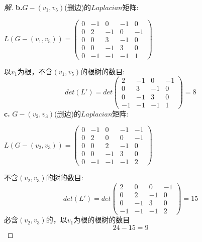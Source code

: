 \documentclass[UTF8, onecolumn, a4paper]{article}
\begin{document}
\begin{description}
\begin{proof}[解]
\textbf{b.}$G-(v_1,v_5)$(删边)的$Laplacian$矩阵:
\begin{center}
	$L(G-(v_1,v_5))=
	\begin{pmatrix}
	0 & -1 & 0 & -1 & 0\\
	0 & 2 & -1 & 0 & -1\\
	0 & 0 & 3 & -1 & 0 \\
	0 & 0 & -1 & 3 & 0 \\
	0 & -1 & -1 & -1 & 1 
	\end{pmatrix}$
\end{center}
以$v_1$为根，不含$(v_1, v_5)$的根树的数目:
$$det(L') = det\left(
\begin{array}{cccc}
 2 & -1 & 0 & -1\\
 0 & 3 & -1 & 0 \\
 0 & -1 & 3 & 0 \\
 -1 & -1 & -1 & 1 
\end{array}
\right) = 8 $$
\textbf{c.} 
$G-(v_2,v_3)$(删边)的$Laplacian$矩阵:
\begin{center}
	$L(G-(v_2,v_3))=\begin{pmatrix}
	0 & -1 & 0 & -1 & -1\\
	0 & 2 & 0 & 0 & -1\\
	0 & 0 & 2 & -1 & 0 \\
	0 & 0 & -1 & 3 & 0 \\
	0 & -1 & -1 & -1 & 2
	\end{pmatrix}$
\end{center}
不含$(v_2, v_3)$的树的数目:
$$det(L') = det\left(
\begin{array}{cccc}
2 & 0 & 0 & -1\\
0 & 2 & -1 & 0 \\
0 & -1 & 3 & 0 \\
-1 & -1 & -1 & 2
\end{array}
\right) =  15$$
必含$(v_2, v_3)$的，以$v_1$为根的根树的数目$$24 - 15 = 9$$
\end{proof}


\end{description}
\end{document}

